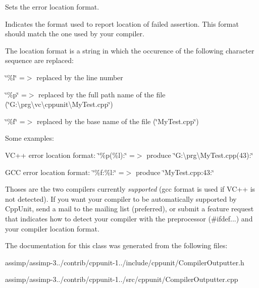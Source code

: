 Sets the error location format. 

Indicates the format used to report location of failed assertion. This format should match the one used by your compiler.

The location format is a string in which the occurence of the following character sequence are replaced\+:


\begin{DoxyItemize}
\item \char`\"{}\%l\char`\"{} =$>$ replaced by the line number
\item \char`\"{}\%p\char`\"{} =$>$ replaced by the full path name of the file (\char`\"{}\+G\+:\textbackslash{}prg\textbackslash{}vc\textbackslash{}cppunit\textbackslash{}\+My\+Test.\+cpp\char`\"{})
\item \char`\"{}\%f\char`\"{} =$>$ replaced by the base name of the file (\char`\"{}\+My\+Test.\+cpp\char`\"{})
\end{DoxyItemize}

Some examples\+:


\begin{DoxyItemize}
\item V\+C++ error location format\+: \char`\"{}\%p(\%l)\+:\char`\"{} =$>$ produce \char`\"{}\+G\+:\textbackslash{}prg\textbackslash{}\+My\+Test.\+cpp(43)\+:\char`\"{}
\item G\+C\+C error location format\+: \char`\"{}\%f\+:\%l\+:\char`\"{} =$>$ produce \char`\"{}\+My\+Test.\+cpp\+:43\+:\char`\"{}
\end{DoxyItemize}

Thoses are the two compilers currently {\itshape supported} (gcc format is used if V\+C++ is not detected). If you want your compiler to be automatically supported by Cpp\+Unit, send a mail to the mailing list (preferred), or submit a feature request that indicates how to detect your compiler with the preprocessor (\#ifdef...) and your compiler location format. 

The documentation for this class was generated from the following files\+:\begin{DoxyCompactItemize}
\item 
assimp/assimp-\/3../contrib/cppunit-\/1../include/cppunit/Compiler\+Outputter.\+h\item 
assimp/assimp-\/3../contrib/cppunit-\/1../src/cppunit/Compiler\+Outputter.\+cpp\end{DoxyCompactItemize}
